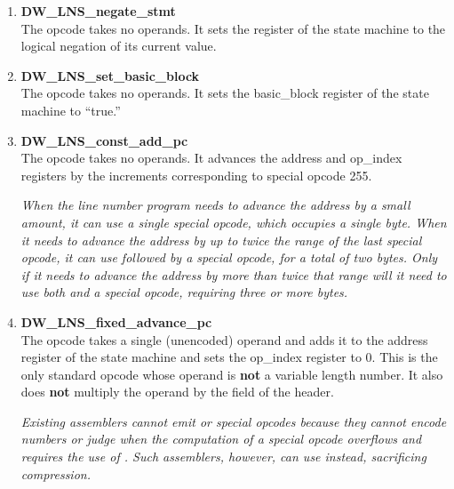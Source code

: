 \begin{enumerate}[1. ]
\item \textbf{DW\_LNS\_negate\_stmt} \\
The  opcode takes no
operands. It sets the  register of the state machine
to the logical negation of its current value.

\item \textbf{DW\_LNS\_set\_basic\_block} \\
The 
opcode
takes no operands. 
It sets the basic\_block register of the
state machine to ``true.''



\item \textbf{DW\_LNS\_const\_add\_pc} \\
The  opcode takes
no operands. It advances the address and op\_index registers
by the increments corresponding to special opcode 255.

\textit{When the line number program needs to advance the address
by a small amount, it can use a single special opcode,
which occupies a single byte. When it needs to advance the
address by up to twice the range of the last special opcode,
it can use  followed by a special opcode,
for a total of two bytes. Only if it needs to advance the
address by more than twice that range will it need to use
both  and a special opcode, requiring three
or more bytes.}

\item \textbf{DW\_LNS\_fixed\_advance\_pc} \\ 
The  opcode
takes a single  (unencoded) operand and adds it to the
address register of the state machine and sets the op\_index
register to 0. This is the only standard opcode whose operand
is \textbf{not} a variable length number. It also does 
\textbf{not} multiply the
operand by the  field of the header.

\textit{Existing assemblers cannot emit 
 or special
opcodes because they cannot encode  numbers or judge when
the computation of a special opcode overflows and requires
the use of . Such assemblers, however, can
use  instead, sacrificing compression.}


\end{enumerate}
